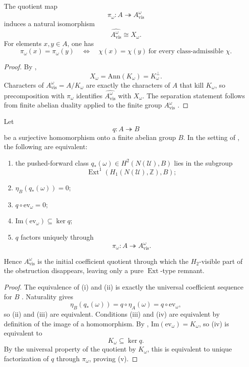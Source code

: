\begin{corollary}\label{cor:intrinsic-character-detection}
The quotient map
\[
\pi_{\omega}:A\twoheadrightarrow A_{\mathrm{vis}}^{\omega}
\]
induces a natural isomorphism
\[
\widehat{A_{\mathrm{vis}}^{\omega}}\cong X_{\omega}.
\]
For elements $x,y\in A$, one has
\[
\pi_{\omega}(x)=\pi_{\omega}(y)
\quad\Longleftrightarrow\quad
\chi(x)=\chi(y)\ \text{for every class-admissible }\chi.
\]
\end{corollary}

\begin{proof}
By ,
\[
X_{\omega}=\mathrm{Ann}(K_{\omega})=K_{\omega}^{\perp}.
\]
Characters of $A_{\mathrm{vis}}^{\omega}=A/K_{\omega}$ are exactly the characters of $A$ that kill $K_{\omega}$, so precomposition with $\pi_{\omega}$ identifies $\widehat{A_{\mathrm{vis}}^{\omega}}$ with $X_{\omega}$. The separation statement follows from finite abelian duality applied to the finite group $A_{\mathrm{vis}}^{\omega}$ \cite[Chap.~5]{DummitFoote2004}.
\end{proof}

\begin{theorem}\label{thm:intrinsic-pure-ext-initiality}
Let
\[
q:A\twoheadrightarrow B
\]
be a surjective homomorphism onto a finite abelian group $B$. In the setting of , the following are equivalent:
\begin{enumerate}[label=(\roman*),nosep]
\item the pushed-forward class $q_*(\omega)\in H^2(N(\mathcal U),B)$ lies in the subgroup
\[
\operatorname{Ext}^1(H_1(N(\mathcal U),\mathbb Z),B);
\]
\item $\eta_B(q_*(\omega))=0$;
\item $q\circ \mathrm{ev}_{\omega}=0$;
\item $\mathrm{Im}(\mathrm{ev}_{\omega})\subseteq \ker q$;
\item $q$ factors uniquely through
\[
\pi_{\omega}:A\twoheadrightarrow A_{\mathrm{vis}}^{\omega}.
\]
\end{enumerate}
Hence $A_{\mathrm{vis}}^{\omega}$ is the initial coefficient quotient through which the $H_2$-visible part of the obstruction disappears, leaving only a pure $\operatorname{Ext}$-type remnant.
\end{theorem}

\begin{proof}
The equivalence of \textup{(i)} and \textup{(ii)} is exactly the universal coefficient sequence for $B$ \cite[Sec.~3.1]{Hatcher2002}. Naturality gives
\[
\eta_B(q_*(\omega))=q\circ \eta_A(\omega)=q\circ \mathrm{ev}_{\omega},
\]
so \textup{(ii)} and \textup{(iii)} are equivalent. Conditions \textup{(iii)} and \textup{(iv)} are equivalent by definition of the image of a homomorphism. By , $\mathrm{Im}(\mathrm{ev}_{\omega})=K_{\omega}$, so \textup{(iv)} is equivalent to
\[
K_{\omega}\subseteq \ker q.
\]
By the universal property of the quotient by $K_{\omega}$, this is equivalent to unique factorization of $q$ through $\pi_{\omega}$, proving \textup{(v)}.
\end{proof}

